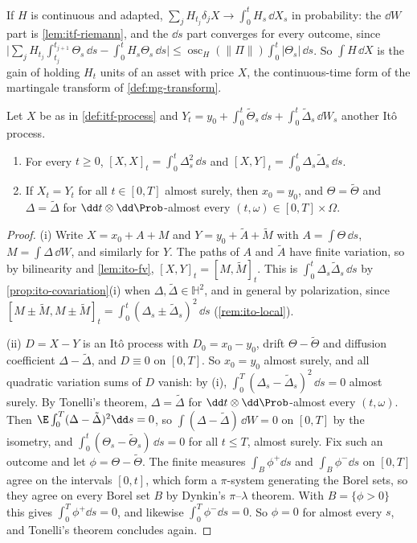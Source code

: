 If $H$ is continuous and adapted, $\sum_jH_{t_j}\delta_jX\to\int_0^tH_s\,\dd X_s$ in probability:
the $\dd W$ part is \cref{lem:itf-riemann}, and the $\dd s$ part converges for every outcome, since
$\big|\sum_jH_{t_j}\int_{t_j}^{t_{j+1}}\Theta_s\,\dd s-\int_0^tH_s\Theta_s\,\dd s\big|\le
\operatorname{osc}_H(\|\Pi\|)\int_0^t|\Theta_s|\,\dd s$. So $\int H\,\dd X$ is the gain of
holding $H_t$ units of an asset with price $X$, the continuous-time form of the martingale
transform of \cref{def:mg-transform}.

\begin{proposition}\label{prop:itf-decomposition}
Let $X$ be as in \cref{def:itf-process} and $Y_t=y_0+\int_0^t\tilde\Theta_s\,\dd s+\int_0^t\tilde\Delta_s\,\dd W_s$
another It\^o process.
\begin{enumerate}[label=(\roman*)]
  \item For every $t\ge0$, $[X,X]_t=\int_0^t\Delta_s^2\,\dd s$ and $[X,Y]_t=\int_0^t\Delta_s\tilde\Delta_s\,\dd s$.
  \item If $X_t=Y_t$ for all $t\in[0,T]$ almost surely, then $x_0=y_0$, and $\Theta=\tilde\Theta$
    and $\Delta=\tilde\Delta$ for $\dd t\otimes\dd\Prob$-almost every $(t,\omega)\in[0,T]\times\Omega$.
\end{enumerate}
\end{proposition}

\begin{proof}
(i) Write $X=x_0+A+M$ and $Y=y_0+\tilde A+\tilde M$ with $A=\int\Theta\,\dd s$,
$M=\int\Delta\,\dd W$, and similarly for $Y$. The paths of $A$ and $\tilde A$ have finite variation,
so by bilinearity and \cref{lem:ito-fv}, $[X,Y]_t=[M,\tilde M]_t$. This is
$\int_0^t\Delta_s\tilde\Delta_s\,\dd s$ by \cref{prop:ito-covariation}(i) when
$\Delta,\tilde\Delta\in\mathbb H^2$, and in general by polarization, since
$[M\pm\tilde M,M\pm\tilde M]_t=\int_0^t(\Delta_s\pm\tilde\Delta_s)^2\,\dd s$ (\cref{rem:ito-local}).

(ii) $D=X-Y$ is an It\^o process with $D_0=x_0-y_0$, drift $\Theta-\tilde\Theta$ and diffusion
coefficient $\Delta-\tilde\Delta$, and $D\equiv0$ on $[0,T]$. So $x_0=y_0$ almost surely, and all quadratic
variation sums of $D$ vanish: by (i), $\int_0^T(\Delta_s-\tilde\Delta_s)^2\,\dd s=0$ almost surely.
By Tonelli's theorem, $\Delta=\tilde\Delta$ for $\dd t\otimes\dd\Prob$-almost every $(t,\omega)$. Then
$\E\int_0^T(\Delta-\tilde\Delta)^2\dd s=0$, so $\int(\Delta-\tilde\Delta)\,\dd W=0$ on $[0,T]$ by the
isometry, and $\int_0^t(\Theta_s-\tilde\Theta_s)\,\dd s=0$ for all $t\le T$, almost surely. Fix such an
outcome and let $\phi=\Theta-\tilde\Theta$. The finite measures $\int_B\phi^+\dd s$ and
$\int_B\phi^-\dd s$ on $[0,T]$ agree on the intervals $[0,t]$, which form a $\pi$-system generating
the Borel sets, so they agree on every Borel set $B$ by Dynkin's $\pi$--$\lambda$ theorem. With
$B=\{\phi>0\}$ this gives $\int_0^T\phi^+\dd s=0$, and likewise $\int_0^T\phi^-\dd s=0$. So
$\phi=0$ for almost every $s$, and Tonelli's theorem concludes again.
\end{proof}

